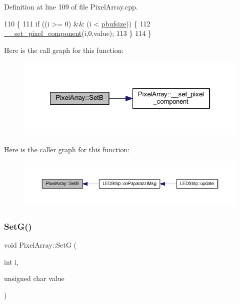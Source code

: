 Definition at line 109 of file Pixel\+Array.\+cpp.


\begin{DoxyCode}
110 \{
111     \textcolor{keywordflow}{if} ((i >= 0) && (i < \hyperlink{class_pixel_array_aca29e70f9b643bff3733ab2e694439a1}{pbufsize})) \{
112         \hyperlink{class_pixel_array_a42c6681bf771332826ecc9ad2a8cea02}{\_\_set\_pixel\_component}(i,0,value);
113     \}
114 \}
\end{DoxyCode}
Here is the call graph for this function\+:\nopagebreak
\begin{figure}[H]
\begin{center}
\leavevmode
\includegraphics[width=322pt]{class_pixel_array_a560a654c59614fd5a6c17adb10083a78_cgraph}
\end{center}
\end{figure}
Here is the caller graph for this function\+:\nopagebreak
\begin{figure}[H]
\begin{center}
\leavevmode
\includegraphics[width=350pt]{class_pixel_array_a560a654c59614fd5a6c17adb10083a78_icgraph}
\end{center}
\end{figure}
\mbox{\label{class_pixel_array_a60ea8084ec95df0d51f46c9b0ff308d5}} 
\subsubsection{\texorpdfstring{Set\+G()}{SetG()}}
{\footnotesize\ttfamily void Pixel\+Array\+::\+SetG (\begin{DoxyParamCaption}\item[{int}]{i,  }\item[{unsigned char}]{value }\end{DoxyParamCaption})}



